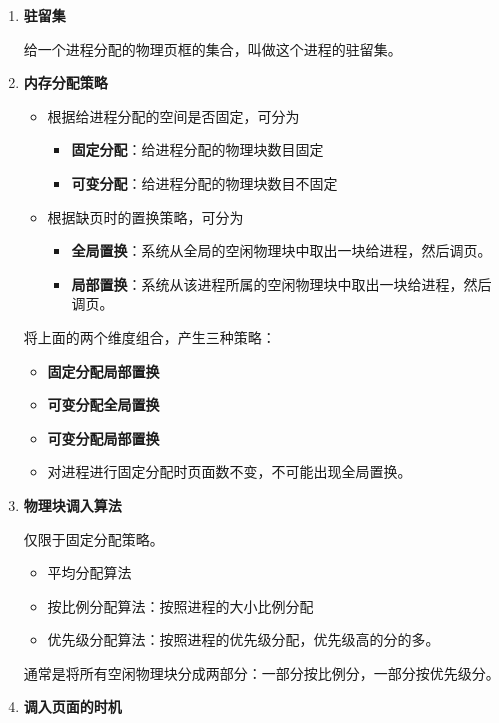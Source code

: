 \documentclass[12pt, a4paper, oneside]{ctexart}
\begin{document}
\begin{enumerate}
  \item {\bf 驻留集}
  
  给一个进程分配的物理页框的集合，叫做这个进程的驻留集。

  \item {\bf 内存分配策略}
  
  \begin{itemize}
    \item 根据给进程分配的空间是否固定，可分为
    \begin{itemize}
      \item {\bf 固定分配}：给进程分配的物理块数目固定
      \item {\bf 可变分配}：给进程分配的物理块数目不固定
    \end{itemize}
    \item 根据缺页时的置换策略，可分为
    \begin{itemize}
      \item {\bf 全局置换}：系统从全局的空闲物理块中取出一块给进程，然后调页。
      \item {\bf 局部置换}：系统从该进程所属的空闲物理块中取出一块给进程，然后调页。
    \end{itemize}
  \end{itemize}
  
  将上面的两个维度组合，产生三种策略：
  
  \begin{itemize}
    \item {\bf 固定分配局部置换}
    \item {\bf 可变分配全局置换}
    \item {\bf 可变分配局部置换}
    \item 对进程进行固定分配时页面数不变，不可能出现全局置换。
  \end{itemize}

  \item {\bf 物理块调入算法}
  
  仅限于固定分配策略。
  \begin{itemize}
    \item 平均分配算法
    \item 按比例分配算法：按照进程的大小比例分配
    \item 优先级分配算法：按照进程的优先级分配，优先级高的分的多。
  \end{itemize}

  通常是将所有空闲物理块分成两部分：一部分按比例分，一部分按优先级分。
  
  \item {\bf 调入页面的时机}
  

\end{enumerate}
\end{document}
